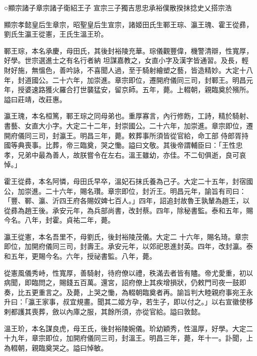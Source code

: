 
\begin{pinyinscope}

 ○顯宗諸子章宗諸子衛紹王子
 宣宗三子獨吉思忠承裕僕散揆抹捻史乂搭宗浩



 顯宗孝懿皇后生章宗，昭聖皇后生宣宗，諸姬田氏生鄆王琮、瀛王瑰、霍王從彞，劉氏生瀛王從憲，王氏生溫王玠。



 鄆王琮，本名承慶，母田氏，其後封裕陵充華。琮儀觀豐偉，機警清辯，性寬厚，好學。世宗選進士之有名行者納
 坦謀嘉教之，女直小字及漢字皆通習。及長，輕財好施，無慍色，善吟詠，不喜聞人過，至于騎射繪塑之藝，皆造精妙。大定十八年，封道國公。二十六年，加崇進。章宗即位，遷開府儀同三司，封鄆王。明昌元年，授婆速路獲火羅合打世襲猛安，留京師。五年，薨。上輟朝，親臨奠於殯所。謚曰莊靖，改莊惠。



 瀛王瑰，本名桓篤，鄆王琮之同母弟也。重厚寡言，內行修飭，工詩，精於騎射、書藝、女直大小字。大定二十二年，封崇國公。二十六年，加崇進。章宗即位，遷開府儀同三司，封瀛王。明昌三年，薨。敕葬事所須皆從官給，命工部
 侍郎胥持國等典喪事。比葬，帝三臨奠，哭之慟。謚曰文敬。其後帝謂輔臣曰：「王性忠孝，兄弟中最為善人，故朕嘗令在左右。溫王雖幼，亦佳。不二旬俱逝，良可哀悼。」



 霍王從彞，本名阿憐，母田氏早卒，溫妃石抹氏養為己子。大定二十五年，封宿國公，加崇進。二十六年，賜名瓚。章宗即位，封沂王。明昌元年，諭旨有司曰：「豐、鄆、瀛、沂四王府各賜奴婢七百人。」四年，詔追封故魯王孰輦為趙王，以從彞為趙王後。承安元年，為兵部尚書，改封蔡。四年，除秘書監。泰和五年，賜今名。八年，封霍。貞祐二年，薨。



 瀛王從憲，本名吾里不，母劉氏，後封裕陵茂儀。大定二
 十六年，賜名琦。章宗即位，加開府儀同三司，封壽王。承安元年，以郊祀恩進封英。四年，改封瀛。泰和五年，更賜今名。六年，授祕書監。八年，薨。



 從憲風儀秀峙，性寬厚，善騎射，待府僚以禮，秩滿去者皆有贐。帝尤愛重，初以病聞，即臨問之，賜錢五百萬。還宮，詔府僚上其疾增損狀，仍敕門司夜一鼓即奏，比五更重言之。及薨，上哭之慟，為輟朝臨奠者再。諭旨判大睦親府事宛王永升曰：「瀛王家事，叔宜規畫。聞其二姬方孕，若生子，即以付之。」以右宣徽使移剌都護其喪葬，斂以內庫之服，其餘所須，亦從官給。謚曰敦懿。



 溫王玠，本名謀良虎，母王氏，後封裕陵婉儀。玠幼穎秀，性溫厚，好學。大定二十九年，章宗即位，加開府儀同三司，封溫王。明昌三年，薨，年十一。訃聞，上為輟朝，親臨奠哭之。謚曰悼敏。




\end{pinyinscope}
